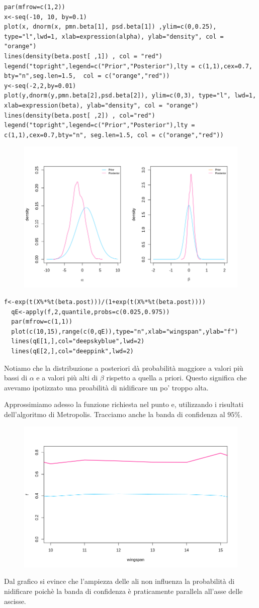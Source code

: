 \begin{lstlisting}[style=R]
par(mfrow=c(1,2))
x<-seq(-10, 10, by=0.1)
plot(x, dnorm(x, pmn.beta[1], psd.beta[1]) ,ylim=c(0,0.25), type="l",lwd=1, xlab=expression(alpha), ylab="density", col = "orange")
lines(density(beta.post[ ,1]) , col = "red")
legend("topright",legend=c("Prior","Posterior"),lty = c(1,1),cex=0.7, bty="n",seg.len=1.5,  col = c("orange","red"))
y<-seq(-2,2,by=0.01)
plot(y,dnorm(y,pmn.beta[2],psd.beta[2]), ylim=c(0,3), type="l", lwd=1, xlab=expression(beta), ylab="density", col = "orange")
lines(density(beta.post[ ,2]) , col="red")
legend("topright",legend=c("Prior","Posterior"),lty = c(1,1),cex=0.7,bty="n", seg.len=1.5, col = c("orange","red"))
\end{lstlisting}
\begin{figure}[h!]
  \centering
  \includegraphics[width=0.7\linewidth]{img/esercizio10-2-3}
  \label{fig:metropolis3}
\end{figure}

\begin{lstlisting}[style = R]
  f<-exp(t(X%*%t(beta.post)))/(1+exp(t(X%*%t(beta.post))))
  qE<-apply(f,2,quantile,probs=c(0.025,0.975))
  par(mfrow=c(1,1))
  plot(c(10,15),range(c(0,qE)),type="n",xlab="wingspan",ylab="f")
  lines(qE[1,],col="deepskyblue",lwd=2)
  lines(qE[2,],col="deeppink",lwd=2)
\end{lstlisting}
Notiamo che la distribuzione a posteriori dà probabilità maggiore a valori più bassi di $\alpha$ e a valori più alti di $\beta$ rispetto a quella a priori. 
Questo significa che avevamo ipotizzato una proabilità di nidificare un po' troppo alta.

Approssimiamo adesso la funzione richiesta nel punto e, utilizzando i risultati dell'algoritmo di Metropolis. Tracciamo anche la banda di confidenza al $95\%$.
\begin{figure}[h!]
  \centering
  \includegraphics[width=0.7\linewidth]{img/esercizio10-2-4}
  \label{fig:metropolis4}
\end{figure}

Dal grafico si evince che l'ampiezza delle ali non influenza la probabilità di nidificare poichè la banda di confidenza è praticamente parallela all'asse delle ascisse.

